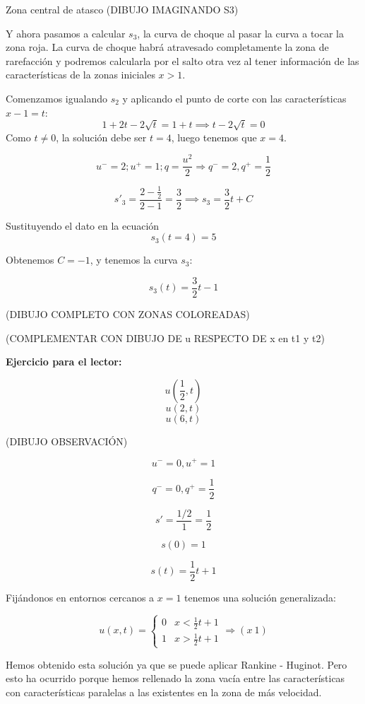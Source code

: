 \begin{example}{Zona central de atasco}
			(DIBUJO IMAGINANDO S3)

			Y ahora pasamos a calcular $s_3$, la curva de choque al pasar la curva a tocar la zona roja. La curva de choque habrá atravesado completamente la zona de rarefacción y podremos calcularla por el salto otra vez al tener información de las características de la zonas iniciales $x>1$.

			Comenzamos igualando $s_2$ y aplicando el punto de corte con las características $x-1=t$:
			$$ 1+2t - 2 \sqrt{t} = 1 + t \implies t- 2 \sqrt{t} = 0$$
			Como $t\neq 0$, la solución debe ser $t=4$, luego tenemos que $x=4$.

			$$u^{-} = 2 ; u^{+} = 1; q = \frac{u^2}{2} \Rightarrow q^{-} = 2, q^{+} = \frac{1}{2}$$

			$$s'_3 = \frac{2 - \frac{1}{2}}{2 - 1} = \frac{3}{2} \implies s_3 = \frac{3}{2} t + C$$

			Sustituyendo el dato en la ecuación
			$$s_3 (t = 4) = 5$$

			Obtenemos $C = -1$, y tenemos la curva $s_3$:

			$$s_3(t) = \frac{3}{2} t - 1$$

			(DIBUJO COMPLETO CON ZONAS COLOREADAS)

			(COMPLEMENTAR CON DIBUJO DE u RESPECTO DE x en t1 y t2)


			\textbf{Ejercicio para el lector:}

			$$u(\frac{1}{2},t)$$
			$$u(2,t)$$
			$$u(6,t)$$


		\end{example}

		\obs

		(DIBUJO OBSERVACIÓN)

		$$u^{-} = 0, u^+ = 1$$

		$$q^{-} = 0, q^+ = \frac{1}{2}$$

		$$s' = \frac{1/2}{1} = \frac{1}{2}$$

		$$s(0) = 1$$

		$$s(t) = \frac{1}{2}t + 1$$

		Fijándonos en entornos cercanos a $x=1$ tenemos una solución generalizada:

		$$u(x,t) =
		\begin{cases}
			0 & x < \frac{1}{2} t + 1 \\
			1 & x > \frac{1}{2} t + 1
		\end{cases} \Rightarrow (x ~ 1)$$


		Hemos obtenido esta solución ya que se puede aplicar Rankine - Huginot. Pero esto ha ocurrido porque hemos rellenado la zona vacía entre las características con características paralelas a las existentes en la zona de más velocidad.

